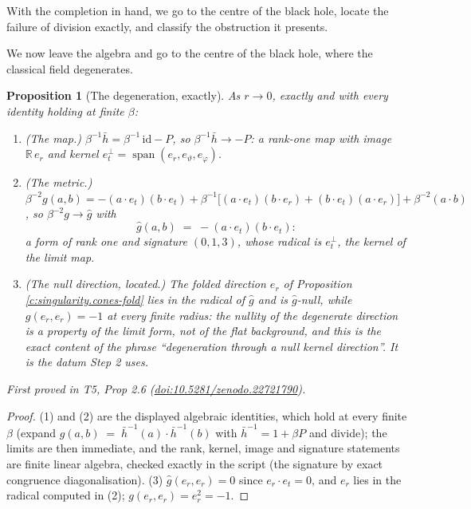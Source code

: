 \documentclass[11pt]{article}
\newtheorem{proposition}[theorem]{Proposition}
\theoremstyle{definition}
\theoremstyle{plain}
\providecommand{\R}{}\renewcommand{\R}{\mathbb{R}}
\providecommand{\er}{}\renewcommand{\er}{e_r}
\providecommand{\et}{}\renewcommand{\et}{e_t}
\providecommand{\hb}{}\renewcommand{\hb}{\bar{h}}
\begin{document}
With the completion in hand, we go to the centre of the black hole, locate the failure of division exactly, and classify the obstruction it presents.

We now leave the algebra and go to the centre of the black hole, where the classical field degenerates.

\begin{proposition}[The degeneration, exactly]\label{c:singularity.degeneration-exactly}
As $r \to 0$, exactly and with every identity holding at finite $\beta$:
\begin{enumerate}
\item (The map.) $\beta^{-1}\hb = \beta^{-1}\,\mathrm{id} - P$, so $\beta^{-1}\hb \to -P$: a rank-one map with image $\R\,\er$ and kernel $\et^{\perp} = \operatorname{span}(\er, e_\vartheta, e_\varphi)$.
\item (The metric.) $\beta^{-2} g(a,b) = -(a\cdot\et)(b\cdot\et) + \beta^{-1}\bigl[(a\cdot\et)(b\cdot\er) + (b\cdot\et)(a\cdot\er)\bigr] + \beta^{-2}(a \cdot b)$, so $\beta^{-2}g \to \hat g$ with
\[
\hat g(a,b) \;=\; -(a\cdot\et)(b\cdot\et) :
\]
a form of rank one and signature $(0,1,3)$, whose radical is $\et^{\perp}$, the kernel of the limit map.
\item (The null direction, located.) The folded direction $\er$ of Proposition \ref{c:singularity.cones-fold} lies in the radical of $\hat g$ and is $\hat g$-null, while $g(\er,\er) = -1$ at every finite radius: the nullity of the degenerate direction is a property of the limit form, not of the flat background, and this is the exact content of the phrase ``degeneration through a null kernel direction''. It is the datum Step 2 uses.
\end{enumerate}
\emph{First proved in} T5, Prop 2.6 (\href{https://doi.org/10.5281/zenodo.22721790}{doi:10.5281/zenodo.22721790}).
\end{proposition}
\begin{proof}
(1) and (2) are the displayed algebraic identities, which hold at every finite $\beta$ (expand $g(a,b) \;=\; \hb^{-1}(a) \cdot \hb^{-1}(b)$ with $\hb^{-1} = 1 + \beta P$ and divide); the limits are then immediate, and the rank, kernel, image and signature statements are finite linear algebra, checked exactly in the script (the signature by exact congruence diagonalisation). (3) $\hat g(\er, \er) = 0$ since $\er \cdot \et = 0$, and $\er$ lies in the radical computed in (2); $g(\er,\er) = \er^2 = -1$.

\end{proof}
\end{document}
